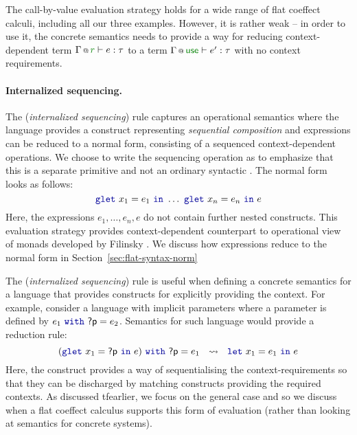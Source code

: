 The call-by-value evaluation strategy holds for a wide range of flat coeffect calculi, including all
our three examples. However, it is rather weak -- in order to use it, the concrete semantics needs
to provide a way for reducing context-dependent term $\coctx{\Gamma}{\cclrd{r}} \vdash e : \tau$ to
a term $\coctx{\Gamma}{\cunit} \vdash e' : \tau$ with no context requirements. 

\paragraph{Internalized sequencing.}

The (\emph{internalized sequencing}) rule captures an operational semantics where the language
provides a construct representing \emph{sequential composition} and expressions can be reduced to 
a normal form, consisting of a sequenced context-dependent operations. We choose to write the 
sequencing operation as  to emphasize that this is a separate primitive and not an 
ordinary syntactic . The normal form looks as follows:
%
\begin{equation*}
\kvd{glet}~x_1 = e_1~\kvd{in}~\ldots~\kvd{glet}~x_n = e_n~\kvd{in}~e
\end{equation*}
%
Here, the expressions $e_1, \ldots, e_n, e$ do not contain further nested  constructs.
This evaluation strategy provides context-dependent counterpart to operational view of monads
developed by Filinsky \cite{monads-inaction}. We discuss how expressions reduce to the normal form
in Section~\ref{sec:flat-syntax-norm}

The (\emph{internalized sequencing}) rule is useful when defining a concrete semantics for 
a language that provides constructs for explicitly providing the context. For example, consider
a language with implicit parameters where a parameter is defined by $e_1~\kvd{with}~\ident{?p}=e_2$.
Semantics for such language would provide a reduction rule:
%
\begin{equation*}
(\kvd{glet}~x_1 = \ident{?p}~\kvd{in}~e)~\kvd{with}~\ident{?p}=e_1 ~~\leadsto~~ \kvd{let}~x_1 = e_1~\kvd{in}~e
\end{equation*}
%
Here, the  construct provides a way of sequentialising the context-requi\-rements so
that they can be discharged by matching constructs providing the required contexts. As discussed
tfearlier, we focus on the general case and so we discuss when a flat coeffect calculus supports
this form of evaluation (rather than looking at semantics for concrete systems).

